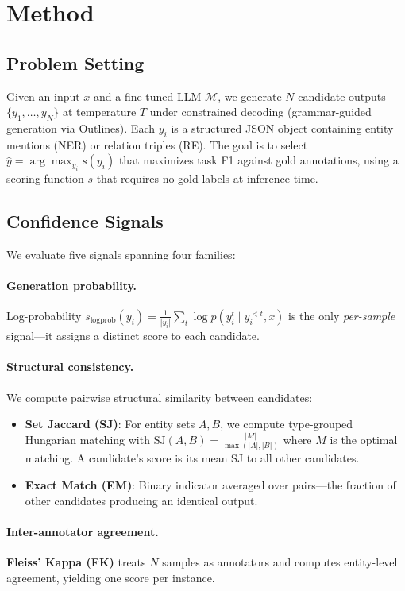 \documentclass[11pt,a4paper]{article}
\begin{document}
\section{Method}

\subsection{Problem Setting}

Given an input $x$ and a fine-tuned LLM $\mathcal{M}$, we generate $N$ candidate outputs $\{y_1, \ldots, y_N\}$ at temperature $T$ under constrained decoding (grammar-guided generation via Outlines). Each $y_i$ is a structured JSON object containing entity mentions (NER) or relation triples (RE). The goal is to select $\hat{y} = \arg\max_{y_i} s(y_i)$ that maximizes task F1 against gold annotations, using a scoring function $s$ that requires no gold labels at inference time.

\subsection{Confidence Signals}

We evaluate five signals spanning four families:

\paragraph{Generation probability.} Log-probability $s_{\text{logprob}}(y_i) = \frac{1}{|y_i|} \sum_{t} \log p(y_i^t \mid y_i^{<t}, x)$ is the only \emph{per-sample} signal---it assigns a distinct score to each candidate.

\paragraph{Structural consistency.} We compute pairwise structural similarity between candidates:
\begin{itemize}
\item \textbf{Set Jaccard (SJ)}: For entity sets $A, B$, we compute type-grouped Hungarian matching with $\text{SJ}(A,B) = \frac{|M|}{\max(|A|,|B|)}$ where $M$ is the optimal matching. A candidate's score is its mean SJ to all other candidates.
\item \textbf{Exact Match (EM)}: Binary indicator averaged over pairs---the fraction of other candidates producing an identical output.
\end{itemize}

\paragraph{Inter-annotator agreement.} \textbf{Fleiss' Kappa (FK)} treats $N$ samples as annotators and computes entity-level agreement, yielding one score per instance.
\end{document}
